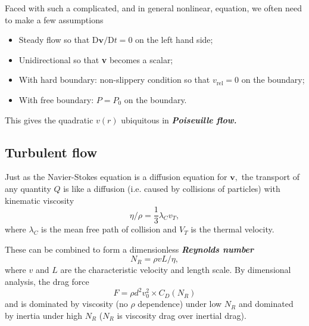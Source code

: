 \documentclass{article}
\begin{document}
Faced with such a complicated, and in general nonlinear, equation, we often need to make a few assumptions
\begin{itemize}
    \item Steady flow so that $\mathrm{D} \mathbf{v} / \mathrm{D} t = 0$ on the left hand side;
    \item Unidirectional so that \textbf{v} becomes a scalar;
    \item With hard boundary: non-slippery condition so that $v_{\mathrm{rel} } = 0$ on the boundary;
    \item With free boundary: $P = P_0$ on the boundary.
\end{itemize}
This gives the quadratic $v(r)$ ubiquitous in \textit{\textbf{Poiseuille flow.}}

\subsection{Turbulent flow}
Just as the Navier-Stokes equation is a diffusion equation for $\mathbf{v},$ the transport of any quantity $Q$ is like a diffusion (i.e. caused by collisions of particles) with kinematic viscosity
\[
    \eta /\rho  = \frac{1}{3}\lambda_C v_{T},
\]
where $\lambda_C$ is the mean free path of collision and $V_T$ is the thermal velocity. 

These can be combined to form a dimensionless \textit{\textbf{Reynolds number}}
\[
    N_R = \rho v L / \eta,
\] 
where $v$ and $L$ are the characteristic velocity and length scale. By dimensional analysis, the drag force
\[
    F = \rho d^2 v_0^2 \times C_D(N_R)
\]
and is dominated by viscosity (no $\rho $ dependence) under low $N_R$ and dominated by inertia under high $N_R$ ($N_R$ is viscosity drag over inertial drag). 
\end{document}
